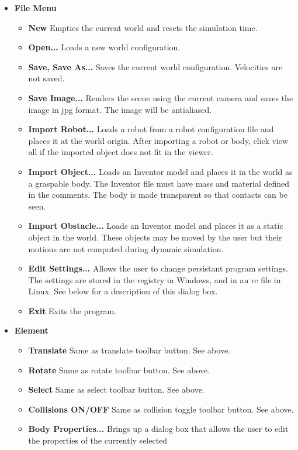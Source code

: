 \begin{itemize}
\item \textbf{File Menu}
\begin {itemize}
\item \textbf{New} Empties the current world and resets the simulation time.
\item \textbf{Open...}  Loads a new world configuration.
\item \textbf{Save, Save As...}  Saves the current world
  configuration. Velocities are not saved.
\item \textbf{Save Image...}  Renders the scene using the current
  camera and saves the image in jpg format. The image will be
  antialiased.
\item \textbf{Import Robot...}  Loads a robot from a robot
  configuration file and places it at the world origin. After
  importing a robot or body, click view all if the imported object
  does not fit in the viewer.
\item \textbf{Import Object...}  Loads an Inventor model and places it
  in the world as a graspable body. The Inventor file must have mass
  and material defined in the comments. The body is made transparent
  so that contacts can be seen.
\item \textbf{Import Obstacle...}  Loads an Inventor model and places
  it as a static object in the world. These objects may be moved by
  the user but their motions are not computed during dynamic
  simulation.
\item \textbf{Edit Settings...}  Allows the user to change persistant
  program settings. The settings are stored in the registry in
  Windows, and in an rc file in Linux. See below for a description of
  this dialog box.
\item \textbf{Exit} Exits the program.
\end{itemize}
\item \textbf{Element}
\begin{itemize}
\item \textbf{Translate} Same as translate toolbar button. See above.
\item \textbf{Rotate} Same as rotate toolbar button. See above.
\item \textbf{Select} Same as select toolbar button. See above.
\item \textbf{Collisions ON/OFF} Same as collision toggle toolbar
  button. See above.
\item \textbf{Body Properties...}  Brings up a dialog box that allows
  the user to edit the properties of the currently selected

\end{itemize}
\end{itemize}
